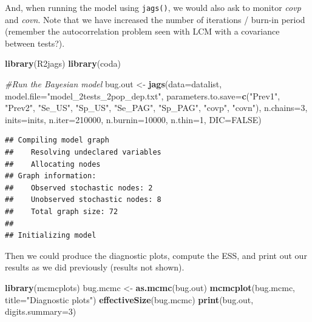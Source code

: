 \documentclass[
]{book}
\newenvironment{Shaded}{\begin{snugshade}}{\end{snugshade}}
\newcommand{\AttributeTok}[1]{\textcolor[rgb]{0.13,0.29,0.53}{#1}}
\newcommand{\CommentTok}[1]{\textcolor[rgb]{0.56,0.35,0.01}{\textit{#1}}}
\newcommand{\ConstantTok}[1]{\textcolor[rgb]{0.56,0.35,0.01}{#1}}
\newcommand{\DecValTok}[1]{\textcolor[rgb]{0.00,0.00,0.81}{#1}}
\newcommand{\FunctionTok}[1]{\textcolor[rgb]{0.13,0.29,0.53}{\textbf{#1}}}
\newcommand{\NormalTok}[1]{#1}
\newcommand{\OtherTok}[1]{\textcolor[rgb]{0.56,0.35,0.01}{#1}}
\newcommand{\StringTok}[1]{\textcolor[rgb]{0.31,0.60,0.02}{#1}}
\begin{document}
And, when running the model using \texttt{jags()}, we would also ask to monitor \emph{covp} and \emph{covn}. Note that we have increased the number of iterations / burn-in period (remember the autocorrelation problem seen with LCM with a covariance between tests?).

\begin{Shaded}
\begin{Highlighting}[]
\FunctionTok{library}\NormalTok{(R2jags)}
\FunctionTok{library}\NormalTok{(coda)}

\CommentTok{\#Run the Bayesian model}
\NormalTok{bug.out }\OtherTok{\textless{}{-}} \FunctionTok{jags}\NormalTok{(}\AttributeTok{data=}\NormalTok{datalist,                             }
               \AttributeTok{model.file=}\StringTok{"model\_2tests\_2pop\_dep.txt"}\NormalTok{,     }
               \AttributeTok{parameters.to.save=}\FunctionTok{c}\NormalTok{(}\StringTok{"Prev1"}\NormalTok{, }\StringTok{"Prev2"}\NormalTok{, }\StringTok{"Se\_US"}\NormalTok{, }\StringTok{"Sp\_US"}\NormalTok{, }\StringTok{"Se\_PAG"}\NormalTok{, }\StringTok{"Sp\_PAG"}\NormalTok{, }\StringTok{"covp"}\NormalTok{, }\StringTok{"covn"}\NormalTok{),               }
               \AttributeTok{n.chains=}\DecValTok{3}\NormalTok{,                                 }
               \AttributeTok{inits=}\NormalTok{inits,                                }
               \AttributeTok{n.iter=}\DecValTok{210000}\NormalTok{,                                }
               \AttributeTok{n.burnin=}\DecValTok{10000}\NormalTok{,                              }
               \AttributeTok{n.thin=}\DecValTok{1}\NormalTok{,                                   }
               \AttributeTok{DIC=}\ConstantTok{FALSE}\NormalTok{)                                   }
\end{Highlighting}
\end{Shaded}

\begin{verbatim}
## Compiling model graph
##    Resolving undeclared variables
##    Allocating nodes
## Graph information:
##    Observed stochastic nodes: 2
##    Unobserved stochastic nodes: 8
##    Total graph size: 72
## 
## Initializing model
\end{verbatim}

Then we could produce the diagnostic plots, compute the ESS, and print out our results as we did previously (results not shown).

\begin{Shaded}
\begin{Highlighting}[]
\FunctionTok{library}\NormalTok{(mcmcplots)}
\NormalTok{bug.mcmc }\OtherTok{\textless{}{-}} \FunctionTok{as.mcmc}\NormalTok{(bug.out)          }
\FunctionTok{mcmcplot}\NormalTok{(bug.mcmc, }\AttributeTok{title=}\StringTok{"Diagnostic plots"}\NormalTok{) }
\FunctionTok{effectiveSize}\NormalTok{(bug.mcmc)}
\FunctionTok{print}\NormalTok{(bug.out, }\AttributeTok{digits.summary=}\DecValTok{3}\NormalTok{) }
\end{Highlighting}
\end{Shaded}
\end{document}
